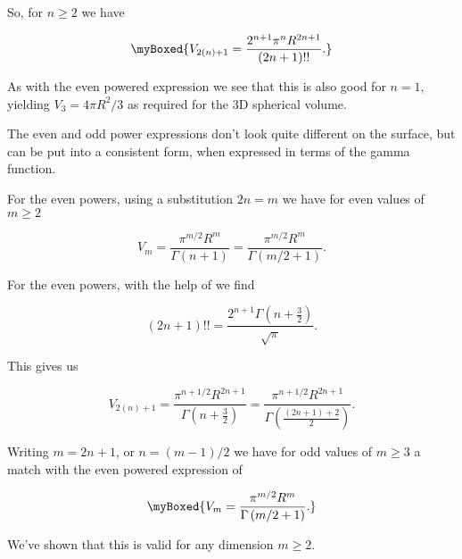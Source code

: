 {So, for $n \ge 2$ we have

\begin{equation}\label{eqn:basicStatMechProblemSet3Problem1:460}
\myBoxed{
V_{2(n)+1} = \frac{2^{n+1} \pi^n R^{2 n + 1}}{(2n +1)!!}.
}
\end{equation}

As with the even powered expression  we see that this is also good for $n = 1$, yielding $V_3 = 4 \pi R^2/3$ as required for the 3D spherical volume.

The even and odd power expressions don't look quite different on the surface, but can be put into a consistent form, when expressed in terms of the gamma function.  

For the even powers, using a substitution $2 n = m$ we have for even values of $m \ge 2$

\begin{equation}\label{eqn:basicStatMechProblemSet3Problem1:480}
V_{m} 
= \frac{\pi^{m/2} R^m}{\Gamma(n + 1)}
= \frac{\pi^{m/2} R^m}{\Gamma(m/2 + 1)}.
\end{equation}

For the even powers, with the help of \citep{abramowitz1964handbook} we find

\begin{equation}\label{eqn:basicStatMechProblemSet3Problem1:500}
(2 n + 1)!! = \frac{2^{n+1} \Gamma\left(n + \frac{3}{2}\right)}{\sqrt{\pi}}.
\end{equation}

This gives us

\begin{dmath}\label{eqn:basicStatMechProblemSet3Problem1:520}
V_{2(n)+1} 
= \frac{\pi^{n + 1/2} R^{2 n + 1}}{\Gamma\left(n + \frac{3}{2}\right)}
= \frac{\pi^{n + 1/2} R^{2 n + 1}}{\Gamma\left(\frac{(2 n + 1) + 2}{2}\right)}.
\end{dmath}

Writing $m = 2 n + 1$, or $n = (m - 1)/2$ we have for odd values of $m \ge 3$ a match with the even powered expression of 

\begin{equation}\label{eqn:basicStatMechProblemSet3Problem1:540}
\myBoxed{
V_{m} 
= 
\frac{ \pi^{m/2} R^{m} }
{
   \Gamma\left( m/2 + 1 \right)
}.
}
\end{equation}

We've shown that this is valid for any dimension $m \ge 2$.

}
